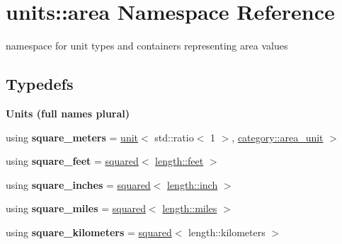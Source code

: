 \hypertarget{namespaceunits_1_1area}{}\section{units\+:\+:area Namespace Reference}
\label{namespaceunits_1_1area}


namespace for unit types and containers representing area values  


\subsection*{Typedefs}
\begin{Indent}{\bf Units (full names plural)}\par
\begin{DoxyCompactItemize}
\item 
\hypertarget{namespaceunits_1_1area_a6bfc4595d4d354ce15d966600a3a4fe8}{}using {\bfseries square\+\_\+meters} = \hyperlink{structunits_1_1unit}{unit}$<$ std\+::ratio$<$ 1 $>$, \hyperlink{namespaceunits_1_1category_af6be136b7d9c842cb68b24eac22e79d1}{category\+::area\+\_\+unit} $>$\label{namespaceunits_1_1area_a6bfc4595d4d354ce15d966600a3a4fe8}

\item 
\hypertarget{namespaceunits_1_1area_a68cfbcf90a8d1d5f943d6b233eb041bd}{}using {\bfseries square\+\_\+feet} = \hyperlink{group___unit_manipulators_ga636346f7898c35eb98a796bec1d77fb2}{squared}$<$ \hyperlink{structunits_1_1unit}{length\+::feet} $>$\label{namespaceunits_1_1area_a68cfbcf90a8d1d5f943d6b233eb041bd}

\item 
\hypertarget{namespaceunits_1_1area_a4be70ff116e492421fb087a468b9efb8}{}using {\bfseries square\+\_\+inches} = \hyperlink{group___unit_manipulators_ga636346f7898c35eb98a796bec1d77fb2}{squared}$<$ \hyperlink{structunits_1_1unit}{length\+::inch} $>$\label{namespaceunits_1_1area_a4be70ff116e492421fb087a468b9efb8}

\item 
\hypertarget{namespaceunits_1_1area_a5c645c444999b73480684394eda08610}{}using {\bfseries square\+\_\+miles} = \hyperlink{group___unit_manipulators_ga636346f7898c35eb98a796bec1d77fb2}{squared}$<$ \hyperlink{structunits_1_1unit}{length\+::miles} $>$\label{namespaceunits_1_1area_a5c645c444999b73480684394eda08610}

\item 
\hypertarget{namespaceunits_1_1area_ab619bdc54b0643c40856081d7f048b03}{}using {\bfseries square\+\_\+kilometers} = \hyperlink{group___unit_manipulators_ga636346f7898c35eb98a796bec1d77fb2}{squared}$<$ length\+::kilometers $>$\label{namespaceunits_1_1area_ab619bdc54b0643c40856081d7f048b03}


\end{DoxyCompactItemize}
\end{Indent}
